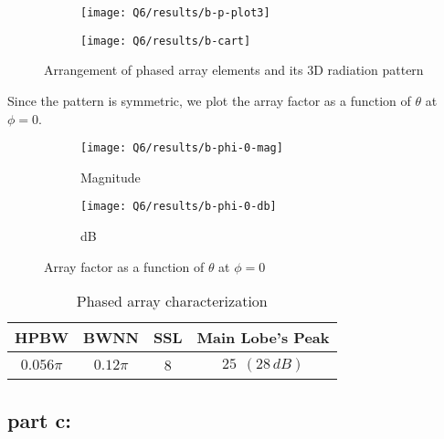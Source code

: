 \documentclass[12pt,onecolumn,a4paper]{article}
\begin{document}
\begin{figure}[H]
	\centering
	\begin{subfigure}{.48\linewidth}
		\centering
		\texttt{[image: Q6/results/b-p-plot3]}
		\caption{}
		\label{fig:b-p-plot3}
	\end{subfigure}
	\begin{subfigure}{.48\linewidth}
		\centering
		\texttt{[image: Q6/results/b-cart]}
		\caption{}
		\label{fig:b-cart}
	\end{subfigure}
	\caption{Arrangement of phased array elements and its 3D radiation pattern}
\end{figure}

Since the pattern is symmetric, we plot the array factor as a function of $\theta$ at $\phi=0$.



\begin{figure}[H]
	\centering
	\begin{subfigure}{\linewidth}
		\centering
		\texttt{[image: Q6/results/b-phi-0-mag]}
		\caption{Magnitude}
		\label{fig:b-phi-0-mag}
	\end{subfigure}
	
	\begin{subfigure}{\linewidth}
		\centering
		\texttt{[image: Q6/results/b-phi-0-db]}
		\caption{dB}
		\label{fig:b-phi-0-db}
	\end{subfigure}
	\caption{Array factor as a function of $\theta$ at $\phi=0$}
\end{figure}


\begin{table}[H]
	\centering
	\caption{Phased array characterization}
	\begin{tabular}{cccc}
		\toprule
		\textbf{HPBW} & \textbf{BWNN} & \textbf{SSL} & \textbf{Main Lobe's Peak}\\
		\midrule
		$0.056\pi$ & $0.12\pi$ & 8 & $25 \ \ (28\,dB)$\\
		\bottomrule
	\end{tabular}
\end{table}

\subsection{part c:}
\end{document}
